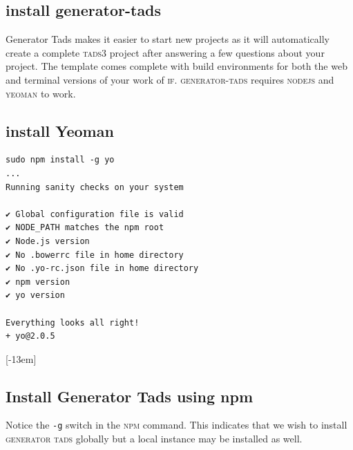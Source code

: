 \subsection{install generator-tads}
Generator Tads makes it easier to start new projects as it will automatically
create a complete \textsc{tads3} project after answering a few questions about
your project. The template comes complete with build environments for both the
web and terminal versions of your work of \textsc{if}. \textsc{generator-tads}
requires \textsc{nodejs} and \textsc{yeoman} to work.
\subsection{install Yeoman}
\begin{lstlisting}
sudo npm install -g yo
...
Running sanity checks on your system

✔ Global configuration file is valid
✔ NODE_PATH matches the npm root
✔ Node.js version
✔ No .bowerrc file in home directory
✔ No .yo-rc.json file in home directory
✔ npm version
✔ yo version

Everything looks all right!
+ yo@2.0.5
\end{lstlisting}
[-13em]
\subsection{Install Generator Tads using npm}
Notice the \texttt{-g} switch in the \textsc{npm} command. This indicates that we wish to
install \textsc{generator tads} globally but a local instance may be installed
as well.

